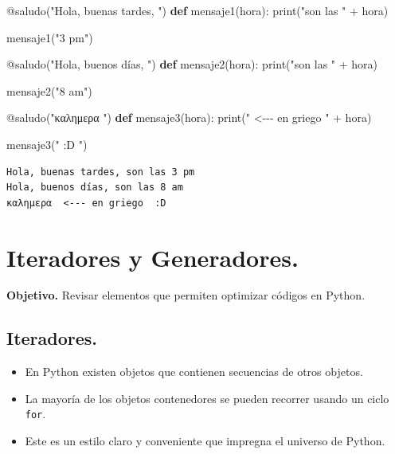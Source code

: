 \documentclass[
  spanish,
  letterpaper,
]{scrbook}
\newenvironment{Shaded}{\begin{snugshade}}{\end{snugshade}}
\newcommand{\AttributeTok}[1]{\textcolor[rgb]{0.40,0.45,0.13}{#1}}
\newcommand{\BuiltInTok}[1]{\textcolor[rgb]{0.00,0.23,0.31}{#1}}
\newcommand{\KeywordTok}[1]{\textcolor[rgb]{0.00,0.23,0.31}{\textbf{#1}}}
\newcommand{\NormalTok}[1]{\textcolor[rgb]{0.00,0.23,0.31}{#1}}
\newcommand{\OperatorTok}[1]{\textcolor[rgb]{0.37,0.37,0.37}{#1}}
\newcommand{\StringTok}[1]{\textcolor[rgb]{0.13,0.47,0.30}{#1}}
\theoremstyle{definition}
\theoremstyle{remark}
\begin{document}
\begin{Shaded}
\begin{Highlighting}[]
\AttributeTok{@saludo}\NormalTok{(}\StringTok{"Hola, buenas tardes, "}\NormalTok{)}
\KeywordTok{def}\NormalTok{ mensaje1(hora):}
    \BuiltInTok{print}\NormalTok{(}\StringTok{"son las "} \OperatorTok{+}\NormalTok{ hora)}

\NormalTok{mensaje1(}\StringTok{"3 pm"}\NormalTok{)}

\AttributeTok{@saludo}\NormalTok{(}\StringTok{"Hola, buenos días, "}\NormalTok{)}
\KeywordTok{def}\NormalTok{ mensaje2(hora):}
    \BuiltInTok{print}\NormalTok{(}\StringTok{"son las "} \OperatorTok{+}\NormalTok{ hora)}
    
\NormalTok{mensaje2(}\StringTok{"8 am"}\NormalTok{)}

\AttributeTok{@saludo}\NormalTok{(}\StringTok{"καλημερα "}\NormalTok{)}
\KeywordTok{def}\NormalTok{ mensaje3(hora):}
    \BuiltInTok{print}\NormalTok{(}\StringTok{" \textless{}{-}{-}{-} en griego "} \OperatorTok{+}\NormalTok{ hora)}
    
\NormalTok{mensaje3(}\StringTok{" :D "}\NormalTok{)}
\end{Highlighting}
\end{Shaded}

\begin{verbatim}
Hola, buenas tardes, son las 3 pm
Hola, buenos días, son las 8 am
καλημερα  <--- en griego  :D 
\end{verbatim}

\chapter{Iteradores y Generadores.}\label{sec-u-iter-gen}

\textbf{Objetivo.} Revisar elementos que permiten optimizar códigos en
Python.

\section{Iteradores.}\label{iteradores.}

\begin{itemize}
\item
  En Python existen objetos que contienen secuencias de otros objetos.
\item
  La mayoría de los objetos contenedores se pueden recorrer usando un
  ciclo \texttt{for}.
\item
  Este es un estilo claro y conveniente que impregna el universo de
  Python.
\end{itemize}
\end{document}
